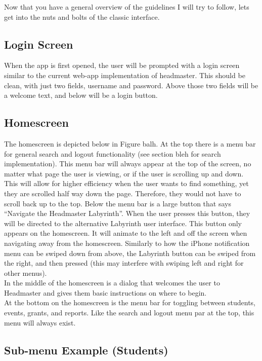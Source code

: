 \documentclass{article}
\begin{document}
Now that you have a general overview of the guidelines I will try to follow, lets get into the nuts and bolts of the classic interface.  


\subsection{Login Screen}

When the app is first opened, the user will be prompted with a login screen similar to the current web-app implementation of headmaster.  This should be clean, with just two fields, username and password.  Above those two fields will be a welcome text, and below will be a login button.

\subsection{Homescreen}

The homescreen is depicted below in Figure balh.  At the top there is a menu bar for general search and logout functionality (see section bleh for search implementation).  This menu bar will always appear at the top of the screen, no matter what page the user is viewing, or if the user is scrolling up and down.  This will allow for higher efficiency when the user wants to find something, yet they are scrolled half way down the page.  Therefore, they would not have to scroll back up to the top.  Below the menu bar is a large button that says “Navigate the Headmaster Labyrinth”.  When the user presses this button, they will be directed to the alternative Labyrinth user interface.  This button only appears on the homescreen.  It will animate to the left and off the screen when navigating away from the homescreen.  Similarly to how the iPhone notification menu can be swiped down from above, the Labyrinth button can be swiped from the right, and then pressed (this may interfere with swiping left and right for other menus).\\

In the middle of the homescreen is a dialog that welcomes the user to Headmaster and gives them basic instructions on where to begin.\\

At the bottom on the homescreen is the menu bar for toggling between students, events, grants, and reports.  Like the search and logout menu par at the top, this menu will always exist.\\


\subsection{Sub-menu Example (Students)}
\end{document}
